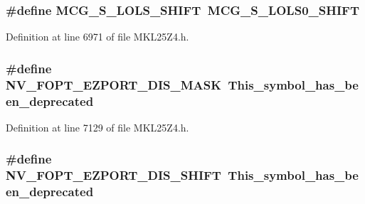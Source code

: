 \subsubsection[{\texorpdfstring{M\+C\+G\+\_\+\+S\+\_\+\+L\+O\+L\+S\+\_\+\+S\+H\+I\+FT}{MCG_S_LOLS_SHIFT}}]{\setlength{\rightskip}{0pt plus 5cm}\#define M\+C\+G\+\_\+\+S\+\_\+\+L\+O\+L\+S\+\_\+\+S\+H\+I\+FT~{\bf M\+C\+G\+\_\+\+S\+\_\+\+L\+O\+L\+S0\+\_\+\+S\+H\+I\+FT}}\hypertarget{group___backward___compatibility___symbols_gae1d3f34b04899a885dcbd465e5154191}{}\label{group___backward___compatibility___symbols_gae1d3f34b04899a885dcbd465e5154191}


Definition at line 6971 of file M\+K\+L25\+Z4.\+h.

\subsubsection[{\texorpdfstring{N\+V\+\_\+\+F\+O\+P\+T\+\_\+\+E\+Z\+P\+O\+R\+T\+\_\+\+D\+I\+S\+\_\+\+M\+A\+SK}{NV_FOPT_EZPORT_DIS_MASK}}]{\setlength{\rightskip}{0pt plus 5cm}\#define N\+V\+\_\+\+F\+O\+P\+T\+\_\+\+E\+Z\+P\+O\+R\+T\+\_\+\+D\+I\+S\+\_\+\+M\+A\+SK~This\+\_\+symbol\+\_\+has\+\_\+been\+\_\+deprecated}\hypertarget{group___backward___compatibility___symbols_ga5c130a6f11de9f04a77b36fd61843e8f}{}\label{group___backward___compatibility___symbols_ga5c130a6f11de9f04a77b36fd61843e8f}


Definition at line 7129 of file M\+K\+L25\+Z4.\+h.

\subsubsection[{\texorpdfstring{N\+V\+\_\+\+F\+O\+P\+T\+\_\+\+E\+Z\+P\+O\+R\+T\+\_\+\+D\+I\+S\+\_\+\+S\+H\+I\+FT}{NV_FOPT_EZPORT_DIS_SHIFT}}]{\setlength{\rightskip}{0pt plus 5cm}\#define N\+V\+\_\+\+F\+O\+P\+T\+\_\+\+E\+Z\+P\+O\+R\+T\+\_\+\+D\+I\+S\+\_\+\+S\+H\+I\+FT~This\+\_\+symbol\+\_\+has\+\_\+been\+\_\+deprecated}\hypertarget{group___backward___compatibility___symbols_gabf1111ccacc4104b2855c4f3851cbaa5}{}\label{group___backward___compatibility___symbols_gabf1111ccacc4104b2855c4f3851cbaa5}


